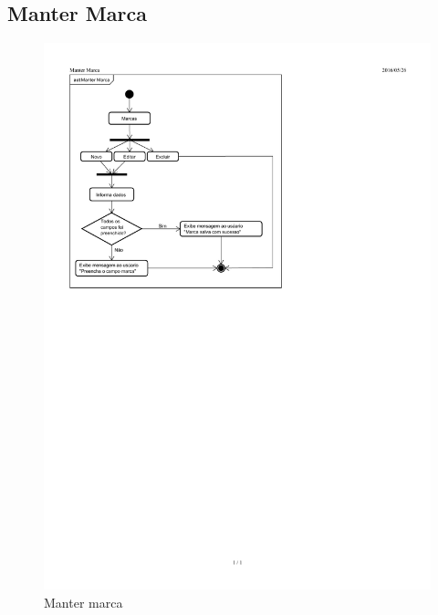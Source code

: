 \documentclass[chapter=TITLE,12pt,oneside,a4paper,english,french,sumario=tradicional,spanish,brazil,]{abntex2}
\begin{document}
\subsection{Manter Marca}
\begin{figure}[h]\centering
	\includegraphics[scale=1.48]{marca.pdf}\caption{Manter marca}
\end{figure}

\newpage
\end{document}
